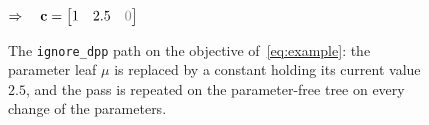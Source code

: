 \begin{figure}[htbp]
\centering
{}

\vspace{1ex}
$\Rightarrow\quad \mvec{c} = \begin{bmatrix}1 & 2.5 & \plotzero\end{bmatrix}$
\caption{The \texttt{ignore\_dpp} path on the objective of~\eqref{eq:example}: the
parameter leaf $\mu$ is replaced by a constant holding its current value $2.5$, and the pass
is repeated on the parameter-free tree on every change of the parameters.}
\label{fig:param-map-evalparams}
\end{figure}

